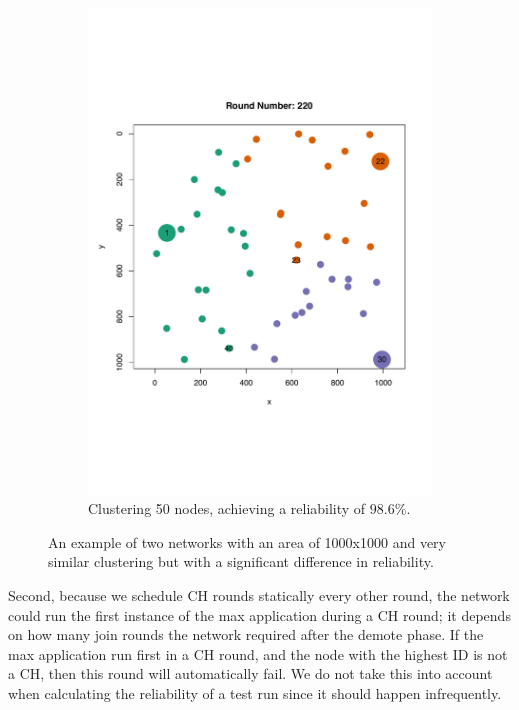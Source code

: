 \begin{figure}[bt]
\begin{subfigure}{0.49\textwidth}
        \includegraphics[width=\textwidth, keepaspectratio]{figure/Results/Discussion/ClusteringExample50nodes1000x1000maxOffRun5Good.pdf}
        \caption{Clustering 50 nodes, achieving a reliability of $98.6\%$.}
        \label{subfig:good-clustering}
    \end{subfigure}
    \caption{An example of two networks with an area of 1000x1000 and very similar clustering but with a significant difference in reliability.}
    \label{fig:comparing-good-and-bad-clustering}
\end{figure}



Second, because we schedule CH rounds statically every other round, the network could run the first instance of the max application during a CH round; it depends on how many join rounds the network required after the demote phase. If the max application run first in a CH round, and the node with the highest ID is not a CH, then this round will automatically fail. We do not take this into account when calculating the reliability of a test run since it should happen infrequently.

